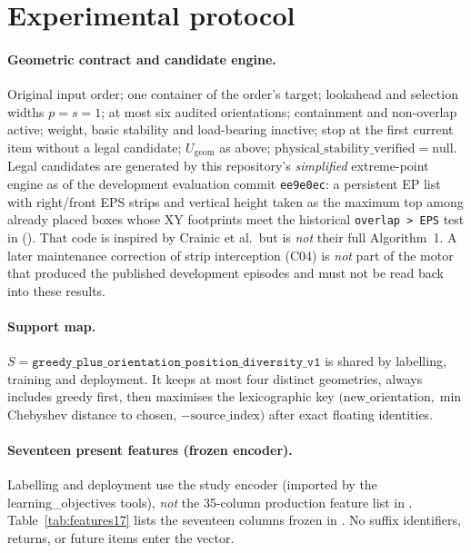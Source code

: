 \section{Experimental protocol}

\paragraph{Geometric contract and candidate engine.}
Original input order; one container of the order's target; lookahead and
selection widths $p=s=1$; at most six audited orientations; containment and
non-overlap active; weight, basic stability and load-bearing inactive; stop at
the first current item without a legal candidate; $U_{\mathrm{geom}}$ as above;
$\mathrm{physical\_stability\_verified}=\mathrm{null}$.
Legal candidates are generated by this repository's \emph{simplified} extreme-point
engine as of the development evaluation commit \texttt{ee9e0ec}: a persistent EP
list with right/front EPS strips and vertical height taken as the maximum top
among already placed boxes whose XY footprints meet the historical
\texttt{overlap > EPS} test in 
(). That code is
inspired by Crainic et al.\ but is \emph{not} their full Algorithm~1. A later
maintenance correction of strip interception (C04) is \emph{not} part of the motor
that produced the published development episodes and must not be read back into
these results.

\paragraph{Support map.}
$S=\texttt{greedy\_plus\_orientation\_position\_diversity\_v1}$ is shared by
labelling, training and deployment. It keeps at most four distinct geometries,
always includes greedy first, then maximises the lexicographic key
$(\mathrm{new\_orientation},\min$ Chebyshev distance to chosen,
$-\mathrm{source\_index})$ after exact floating identities.

\paragraph{Seventeen present features (frozen encoder).}
Labelling and deployment use the study encoder
(imported by the learning\_objectives tools), \emph{not} the 35-column production
feature list in . Table~\ref{tab:features17}
lists the seventeen columns frozen in .
No suffix identifiers, returns, or future items enter the vector.

